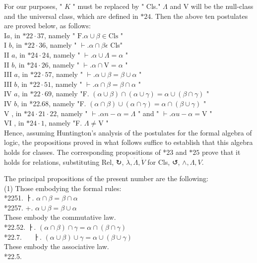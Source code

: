 \documentclass[10pt]{article}
\begin{document}
For our purposes, " $K$ " must be replaced by " Cls." $\Lambda$ and V will be the null-class and the universal class, which are defined in $* 24$. Then the above ten postulates are proved below, as follows:\\
$\mathrm{I} a$, in $* 22 \cdot 37$, namely " $\mathrm{F} . \alpha \cup \beta \in \mathrm{Cls}$ "\\
I $b$, in $* 22 \cdot 36$, namely " $\vdash . \alpha \cap \beta \epsilon$ Cls"\\
II $a$, in $* 24 \cdot 24$, namely " $\vdash . \alpha \cup \Lambda=\alpha$ "\\
II $b$, in $* 24 \cdot 26$, namely " $\vdash . \alpha \cap \mathrm{V}=\alpha$ "\\
III $a$, in $* 22 \cdot 57$, namely " $\vdash . \alpha \cup \beta=\beta \cup \alpha$ "\\
III $b$, in $* 22 \cdot 51$, namely " $\vdash . \alpha \cap \beta=\beta \cap \alpha$ "\\
IV $a$, in $* 22 \cdot 69$, namely "F. $(\alpha \cup \beta) \cap(\alpha \cup \gamma)=\alpha \cup(\beta \cap \gamma)$ "\\
IV $b$, in *22.68, namely "F. $(\alpha \cap \beta) \cup(\alpha \cap \gamma)=\alpha \cap(\beta \cup \gamma)$ "\\
V , in $* 24 \cdot 21 \cdot 22$, namely " $\vdash . \alpha n-\alpha=\Lambda$ " and " $\vdash . \alpha u-\alpha=\mathrm{V}$ "\\
VI , in $* 24 \cdot 1$, namely "F. $\Lambda \neq \mathrm{V}$ "\\
Hence, assuming Huntington's analysis of the postulates for the formal algebra of logic, the propositions proved in what follows suffice to establish that this algebra holds for classes. The corresponding propositions of *23 and $* 25$ prove that it holds for relations, substituting Rel, ↻, $\dot{\lambda}, \dot{\Lambda}, \dot{V}$ for Cls, ↺, $\wedge, \Lambda, V$.

The principal propositions of the present number are the following:\\
(1) Those embodying the formal rules:\\
*2251. ㅏ. $\alpha \cap \beta=\beta \cap \alpha$\\
*2257. +. $\alpha \cup \beta=\beta \cup \alpha$\\
These embody the commutative law.\\
*22.52. ㅏ. $(\alpha \cap \beta) \cap \gamma=\alpha \cap(\beta \cap \gamma)$\\
*22.7. $\quad$ ㅏ. $(\alpha \cup \beta) \cup \gamma=\alpha \cup(\beta \cup \gamma)$\\
These embody the associative law.\\
*22.5.
\end{document}
